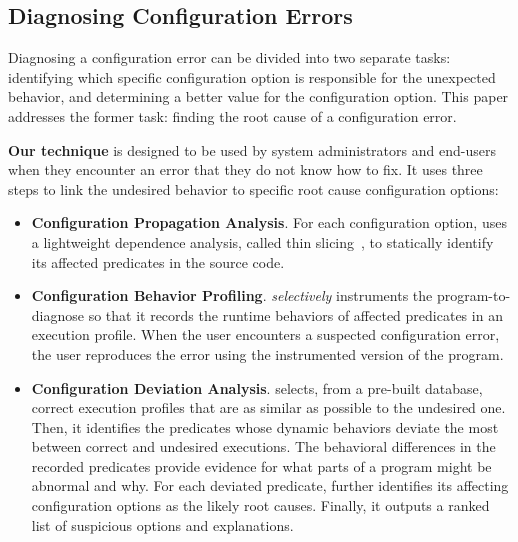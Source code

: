 
\subsection{Diagnosing Configuration Errors}

Diagnosing a configuration error can be divided into two
separate tasks: identifying which specific configuration option is
responsible for the unexpected behavior, and determining a better value for
the configuration option. This paper addresses the former task: finding
the root cause of a configuration error.


\textbf{Our technique} is designed to be used by system administrators
and end-users when they encounter an error
that they do not know how to fix. It uses three steps to 
link the undesired behavior to specific root cause configuration options:

\begin{itemize}
\item \textbf{Configuration Propagation Analysis}. For
each configuration option, \ourtool
uses a lightweight dependence analysis, called thin slicing~\cite{Sridharan:2007},
to statically identify its affected predicates in the source code.

\item \textbf{Configuration Behavior Profiling}. \ourtool
\textit{selectively} instruments the program-to-diagnose
so that it records the runtime behaviors of affected predicates
in an execution profile.
When the user encounters a suspected configuration error, the user
reproduces the error using the instrumented version of the program.

\item \textbf{Configuration Deviation Analysis}.
\ourtool selects, from a pre-built database, correct execution profiles that are as
similar as possible to the undesired one.
Then, it identifies the predicates whose dynamic behaviors deviate the most
between correct and undesired executions.
The behavioral differences in the recorded predicates provide evidence for what parts of a program might be
abnormal and why. %
For each deviated predicate, \ourtool further identifies
its affecting configuration options as the likely root causes.
Finally, it outputs a ranked list of suspicious options and explanations.

\end{itemize}

